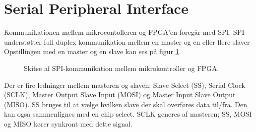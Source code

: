 \section{Serial Peripheral Interface}
Kommunikationen mellem mikrocontolleren og FPGA’en foregår med SPI. %
SPI understøtter full-duplex kommunikation mellem en master og en eller flere slaver
Opstillingen med en master og en slave kan ses på figur \ref{fig:SPImasterslave}.
\begin{figure}[!th]
\centering
\begin{tikzpicture}[scale=0.8]

\end{tikzpicture}
\caption[SPI protokol]{Skitse af SPI-kommunikation mellem mikrokontroller og FPGA.}
\label{fig:SPImasterslave}
\end{figure}

Der er fire ledninger mellem masteren og slaven: Slave Select (SS), Serial Clock (SCLK), Master Output Slave Input (MOSI) og Master Input Slave Output (MISO). SS bruges til at vælge hvilken slave der skal overføres data til/fra. Den kan også sammenlignes med en chip select. SCLK generes af masteren; SS, MOSI og MISO kører synkront med dette signal.
